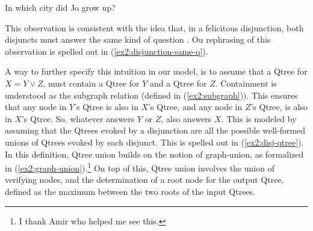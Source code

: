 \begin{exe}
	 {In which city did Jo grow up?}
	\label{ex2:city-disjunction}
\end{exe}

This observation is consistent with the idea that, in a felicitous disjunction, both disjuncts must answer the same kind of question \parencite{Simons2001,Zhang2022}. Ou rephrasing of this observation is spelled out in (\ref{ex2:disjunction-same-q}). 

\begin{exe}
	\label{ex2:disjunction-same-q}
\end{exe}


A way to further specify this intuition in our model, is to assume that a Qtree for $X = Y \vee Z$, must contain a Qtree for $Y$ and a Qtree for $Z$. Containment is understood as the subgraph relation (defined in (\ref{ex2:subgraph})). This ensures that any node in $Y$'s Qtree is also in $X$'s Qtree, and any node in $Z$'s Qtree, is also in $X$'s Qtree. So, whatever answers $Y$ or $Z$, also answers $X$. This is modeled by assuming that the Qtrees evoked by a disjunction are all the possible well-formed unions of Qtrees evoked by each disjunct. This is spelled out in (\ref{ex2:disj-qtree}). In this definition, Qtree union builds on the notion of graph-union, as formalized in (\ref{ex2:graph-union}).\footnote{I thank Amir who helped me see this.} On top of this, Qtree union involves the union of verifying nodes, and the determination of a root node for the output Qtree, defined as the maximum between the two roots of the input Qtrees.


